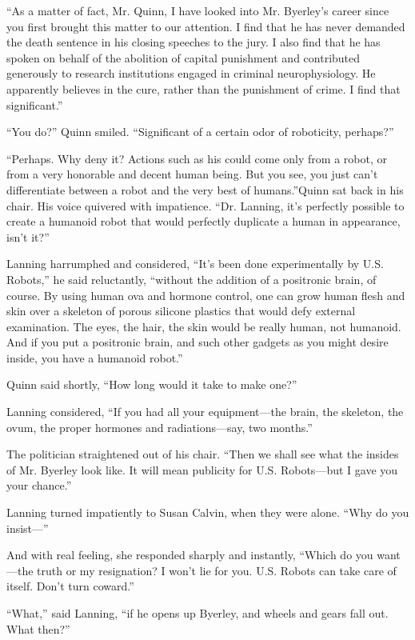 \documentclass[10pt,a5paper,twoside]{book}
\begin{document}
“As a matter of fact, Mr. Quinn, I have looked into Mr. Byerley’s career since you first brought this matter to our attention. I find that he has never demanded the death sentence in his closing speeches to the jury. I also find that he has spoken on behalf of the abolition of capital punishment and contributed generously to research institutions engaged in criminal neurophysiology. He apparently believes in the cure, rather than the punishment of crime. I find that significant.”

“You do?” Quinn smiled. “Significant of a certain odor of roboticity, perhaps?”

“Perhaps. Why deny it? Actions such as his could come only from a robot, or from a very honorable and decent human being. But you see, you just can’t differentiate between a robot and the very best of humans.”Quinn sat back in his chair. His voice quivered with impatience. “Dr. Lanning, it’s perfectly possible to create a humanoid robot that would perfectly duplicate a human in appearance, isn’t it?”

Lanning harrumphed and considered, “It’s been done experimentally by U.S. Robots,” he said reluctantly, “without the addition of a positronic brain, of course. By using human ova and hormone control, one can grow human flesh and skin over a skeleton of porous silicone plastics that would defy external examination. The eyes, the hair, the skin would be really human, not humanoid. And if you put a positronic brain, and such other gadgets as you might desire inside, you have a humanoid robot.”

Quinn said shortly, “How long would it take to make one?”

Lanning considered, “If you had all your equipment—the brain, the skeleton, the ovum, the proper hormones and radiations—say, two months.”

The politician straightened out of his chair. “Then we shall see what the insides of Mr. Byerley look like. It will mean publicity for U.S. Robots—but I gave you your chance.”

Lanning turned impatiently to Susan Calvin, when they were alone. “Why do you insist—”

And with real feeling, she responded sharply and instantly, “Which do you want—the truth or my resignation? I won’t lie for you. U.S. Robots can take care of itself. Don’t turn coward.”

“What,” said Lanning, “if he opens up Byerley, and wheels and gears fall out. What then?”
\end{document}
